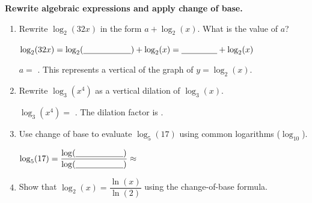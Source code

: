 \documentclass[10pt]{article}
\begin{document}
\vspace{0.1in}

\begin{tcolorbox}[colback=white, colframe=black!40,
    title=\textbf{Tier A --- Approaching Proficiency},
    fonttitle=\bfseries, arc=2mm, left=3mm, right=3mm, top=2mm, bottom=2mm]

\textbf{Rewrite algebraic expressions and apply change of base.}

\begin{enumerate}[leftmargin=1.8em, itemsep=10pt]

\item Rewrite $\log_2(32x)$ in the form $a + \log_2(x)$. What is the value of $a$?

\vspace{4pt}
$\log_2(32x) = \log_2(\blank{2cm}) + \log_2(x) = \blank{1.5cm} + \log_2(x)$

\vspace{2pt}
$a = $ \blank{2cm}. This represents a vertical \blank{3cm} of the graph of $y = \log_2(x)$.

\item Rewrite $\log_3(x^4)$ as a vertical dilation of $\log_3(x)$.

\vspace{4pt}
$\log_3(x^4) = $ \blank{4cm}. The dilation factor is \blank{2cm}.

\item Use change of base to evaluate $\log_5(17)$ using common logarithms ($\log_{10}$).

\vspace{4pt}
$\log_5(17) = \dfrac{\log(\blank{2cm})}{\log(\blank{2cm})} \approx $ \blank{2.5cm}

\item Show that $\log_2(x) = \dfrac{\ln(x)}{\ln(2)}$ using the change-of-base formula.

\vspace{4pt}

\end{enumerate}
\end{tcolorbox}

\vspace{0.1in}
\end{document}
